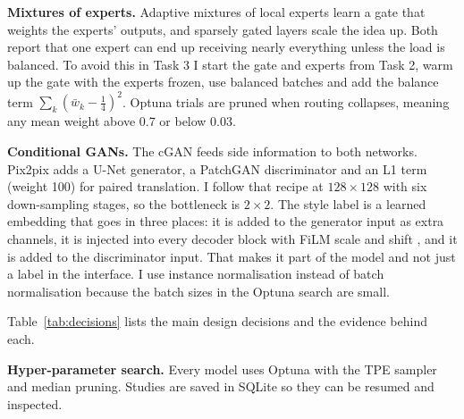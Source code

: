\documentclass[journal,onecolumn,12pt,a4paper]{IEEEtran}
\begin{document}
\textbf{Mixtures of experts.} Adaptive mixtures of local experts \cite{jacobs1991} learn a gate that weights the experts' outputs, and sparsely gated layers \cite{shazeer2017} scale the idea up. Both report that one expert can end up receiving nearly everything unless the load is balanced. To avoid this in Task 3 I start the gate and experts from Task 2, warm up the gate with the experts frozen, use balanced batches and add the balance term $\sum_k(\bar w_k-\frac14)^2$. Optuna trials are pruned when routing collapses, meaning any mean weight above 0.7 or below 0.03.

\textbf{Conditional GANs.} The cGAN \cite{mirza2014} feeds side information to both networks. Pix2pix \cite{isola2017} adds a U-Net \cite{ronneberger2015} generator, a PatchGAN discriminator and an L1 term (weight 100) for paired translation. I follow that recipe at $128\times128$ with six down-sampling stages, so the bottleneck is $2\times2$. The style label is a learned embedding that goes in three places: it is added to the generator input as extra channels, it is injected into every decoder block with FiLM scale and shift \cite{perez2018film}, and it is added to the discriminator input. That makes it part of the model and not just a label in the interface. I use instance normalisation \cite{ulyanov2016} instead of batch normalisation because the batch sizes in the Optuna search are small.

Table~\ref{tab:decisions} lists the main design decisions and the evidence behind each.

\textbf{Hyper-parameter search.} Every model uses Optuna \cite{akiba2019} with the TPE sampler and median pruning. Studies are saved in SQLite so they can be resumed and inspected.
\end{document}
